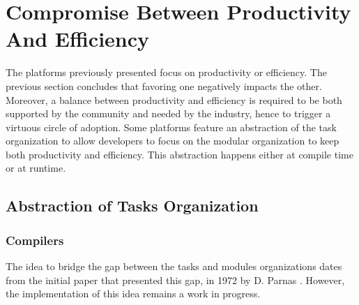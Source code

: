 \section{Compromise Between Productivity And Efficiency} \label{chapter3:software-adoption}

The platforms previously presented focus on productivity or efficiency.
The previous section concludes that favoring one negatively impacts the other.
Moreover, a balance between productivity and efficiency is required to be both supported by the community and needed by the industry, hence to trigger a virtuous circle of adoption.
Some platforms feature an abstraction of the task organization to allow developers to focus on the modular organization to keep both productivity and efficiency.
This abstraction happens either at compile time or at runtime.


\begin{figure}[h!]
%
\end{figure}

\subsection{Abstraction of Tasks Organization}

\subsubsection{Compilers} \label{chapter3:software-adoption:compilers}


The idea to bridge the gap between the tasks and modules organizations dates from the initial paper that presented this gap, in 1972 by D. Parnas \cite{Parnas1972}.
However, the implementation of this idea remains a work in progress.


